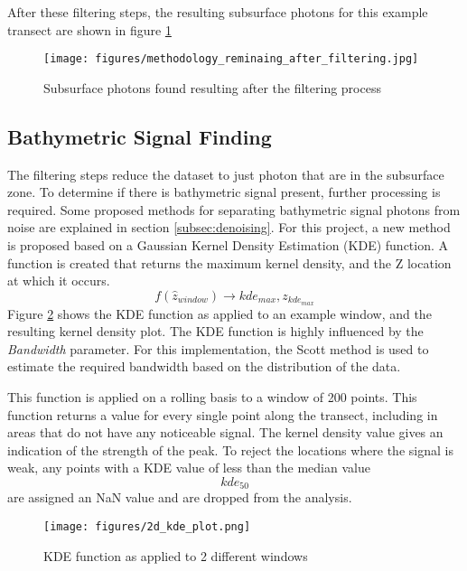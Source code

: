 After these filtering steps, the resulting subsurface photons for this example transect are shown in figure \ref{fig:remaing_photons}

\begin{figure}[h!]
    \centering
    \texttt{[image: figures/methodology\_reminaing\_after\_filtering.jpg]}
    \caption{Subsurface photons found resulting after the filtering process}
    \label{fig:remaing_photons}
\end{figure}

\subsection{Bathymetric Signal Finding}

The filtering steps reduce the dataset to just photon that are in the subsurface zone. To determine if there is bathymetric signal present, further processing is required. Some proposed methods for separating bathymetric signal photons from noise are explained in section \ref{subsec:denoising}. For this project, a new method is proposed based on a Gaussian Kernel Density Estimation (KDE) function. A function is created that returns the maximum kernel density, and the Z location at which it occurs. $$ f(\hat{z}_{window}) \rightarrow kde_{max},z_{kde_{max}} $$ Figure \ref{fig:kdefunc} shows the KDE function as applied to an example window, and the resulting kernel density plot. The KDE function is highly influenced by the \emph{Bandwidth} parameter. For this implementation, the Scott method \parencite{Scott2015} is used to estimate the required bandwidth based on the distribution of the data. 

This function is applied on a rolling basis to a window of 200 points. This function returns a value for every single point along the transect, including in areas that do not have any noticeable signal. The kernel density value gives an indication of the strength of the peak. To reject the locations where the signal is weak, any points with a KDE value of less than the median value $$ kde_{50} $$  are assigned an NaN value and are dropped from the analysis.

\begin{figure}[htbp]
    \centering
    \texttt{[image: figures/2d\_kde\_plot.png]}
    \caption{KDE function as applied to 2 different windows}
    \label{fig:kdefunc}
\end{figure}

